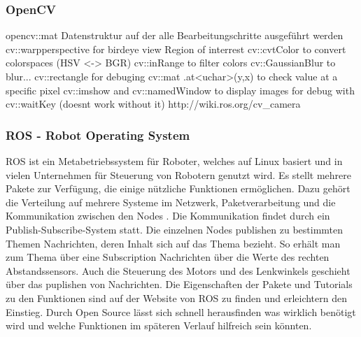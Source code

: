 \subsubsection{OpenCV}
\label{sec:openCV}
opencv::mat Datenstruktur auf der alle Bearbeitungschritte ausgeführt werden
cv::warpperspective for birdeye view
Region of interrest
cv::cvtColor to convert colorspaces (HSV <-> BGR)
cv::inRange to filter colors
cv::GaussianBlur to blur...
cv::rectangle for debuging
cv::mat .at<uchar>(y,x) to check value at a specific pixel
cv::imshow and cv::namedWindow to display images for debug with cv::waitKey (doesnt work without it)
http://wiki.ros.org/cv_camera 

\subsubsection{ROS - Robot Operating System}
\label{sec:ros}
ROS ist ein Metabetriebssystem für Roboter, welches auf Linux basiert und in vielen Unternehmen für Steuerung von Robotern genutzt wird. Es stellt mehrere Pakete zur Verfügung, die einige nützliche Funktionen ermöglichen. Dazu gehört die Verteilung auf mehrere Systeme im Netzwerk, Paketverarbeitung und die Kommunikation zwischen den Nodes \cite{einfuehrungROS}.
Die Kommunikation findet durch ein Publish-Subscribe-System statt. Die einzelnen Nodes publishen zu  bestimmten Themen Nachrichten, deren Inhalt sich auf das Thema bezieht. So erhält man zum Thema  über eine Subscription Nachrichten über die Werte des rechten Abstandssensors. Auch die Steuerung des Motors und des Lenkwinkels geschieht über das puplishen von Nachrichten. 
Die Eigenschaften der Pakete und Tutorials zu den Funktionen sind auf der Website von ROS zu finden und erleichtern den Einstieg. Durch Open Source lässt sich schnell herausfinden was wirklich benötigt wird und welche Funktionen im späteren Verlauf hilfreich sein könnten.

